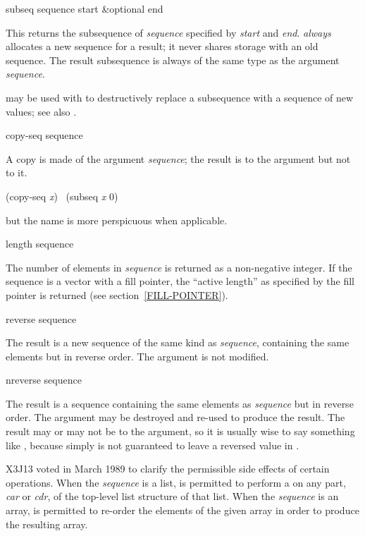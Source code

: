\begin{defun}[Function]
subseq sequence start &optional end

This returns the subsequence of \emph{sequence} specified by \emph{start} and
\emph{end}.
 \emph{always} allocates a new sequence for a result; it never
shares storage with an old sequence.  The result subsequence is always of
the same type as the argument \emph{sequence}.

 may be used with  to destructively replace
a subsequence with a sequence of new values; see also .
\end{defun}

\begin{defun}[Function]
copy-seq sequence

A copy is made of the argument \emph{sequence}; the result is 
to the argument but not  to it.
\begin{lisp}
(copy-seq \emph{x}) \EQ\ (subseq \emph{x} 0)
\end{lisp}
but the name  is more perspicuous when applicable.
\end{defun}

\begin{defun}[Function]
length sequence

The number of elements in \emph{sequence} is returned as a non-negative integer.
If the sequence is a vector with a fill pointer,
the ``active length'' as specified by the fill pointer is returned
(see section~\ref{FILL-POINTER}).
\end{defun}

\begin{defun}[Function]
reverse sequence

The result is a new sequence of the same kind as \emph{sequence},
containing the same elements but in reverse order.
The argument is not modified.
\end{defun}

\begin{defun}[Function]
nreverse sequence

The result is a sequence containing the same elements as \emph{sequence}
but in reverse order.  The argument may be destroyed and re-used to
produce the result.  The result may or may not be  to the
argument, so it is usually wise to say something like
, because simply  is not
guaranteed to leave a reversed value in .
\begin{newer}
X3J13 voted in March 1989 
to clarify the permissible side effects of certain operations.
When the \emph{sequence} is a list,
 is permitted to perform a  on any part,
\emph{car} or \emph{cdr}, of the top-level list structure of that list.
When the \emph{sequence} is an array,
 is permitted to re-order the elements of the given array
in order to produce the resulting array.
\end{newer}
\end{defun}

